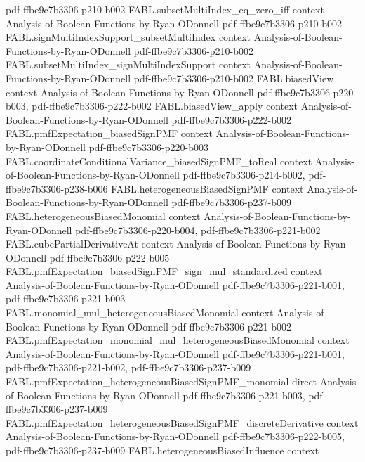 \begin{theorem}
  {pdf-ffbe9c7b3306-p210-b002}
\proofstep
  {FABL.subsetMultiIndex_eq_zero_iff}
  {context}
  {Analysis-of-Boolean-Functions-by-Ryan-ODonnell}
  {pdf-ffbe9c7b3306-p210-b002}
\proofstep
  {FABL.signMultiIndexSupport_subsetMultiIndex}
  {context}
  {Analysis-of-Boolean-Functions-by-Ryan-ODonnell}
  {pdf-ffbe9c7b3306-p210-b002}
\proofstep
  {FABL.subsetMultiIndex_signMultiIndexSupport}
  {context}
  {Analysis-of-Boolean-Functions-by-Ryan-ODonnell}
  {pdf-ffbe9c7b3306-p210-b002}
\proofstep
  {FABL.biasedView}
  {context}
  {Analysis-of-Boolean-Functions-by-Ryan-ODonnell}
  {pdf-ffbe9c7b3306-p220-b003,
    pdf-ffbe9c7b3306-p222-b002}
\proofstep
  {FABL.biasedView_apply}
  {context}
  {Analysis-of-Boolean-Functions-by-Ryan-ODonnell}
  {pdf-ffbe9c7b3306-p222-b002}
\proofstep
  {FABL.pmfExpectation_biasedSignPMF}
  {context}
  {Analysis-of-Boolean-Functions-by-Ryan-ODonnell}
  {pdf-ffbe9c7b3306-p220-b003}
\proofstep
  {FABL.coordinateConditionalVariance_biasedSignPMF_toReal}
  {context}
  {Analysis-of-Boolean-Functions-by-Ryan-ODonnell}
  {pdf-ffbe9c7b3306-p214-b002,
    pdf-ffbe9c7b3306-p238-b006}
\proofstep
  {FABL.heterogeneousBiasedSignPMF}
  {context}
  {Analysis-of-Boolean-Functions-by-Ryan-ODonnell}
  {pdf-ffbe9c7b3306-p237-b009}
\proofstep
  {FABL.heterogeneousBiasedMonomial}
  {context}
  {Analysis-of-Boolean-Functions-by-Ryan-ODonnell}
  {pdf-ffbe9c7b3306-p220-b004,
    pdf-ffbe9c7b3306-p221-b002}
\proofstep
  {FABL.cubePartialDerivativeAt}
  {context}
  {Analysis-of-Boolean-Functions-by-Ryan-ODonnell}
  {pdf-ffbe9c7b3306-p222-b005}
\proofstep
  {FABL.pmfExpectation_biasedSignPMF_sign_mul_standardized}
  {context}
  {Analysis-of-Boolean-Functions-by-Ryan-ODonnell}
  {pdf-ffbe9c7b3306-p221-b001,
    pdf-ffbe9c7b3306-p221-b003}
\proofstep
  {FABL.monomial_mul_heterogeneousBiasedMonomial}
  {context}
  {Analysis-of-Boolean-Functions-by-Ryan-ODonnell}
  {pdf-ffbe9c7b3306-p221-b002}
\proofstep
  {FABL.pmfExpectation_monomial_mul_heterogeneousBiasedMonomial}
  {context}
  {Analysis-of-Boolean-Functions-by-Ryan-ODonnell}
  {pdf-ffbe9c7b3306-p221-b001,
    pdf-ffbe9c7b3306-p221-b002,
    pdf-ffbe9c7b3306-p237-b009}
\proofstep
  {FABL.pmfExpectation_heterogeneousBiasedSignPMF_monomial}
  {direct}
  {Analysis-of-Boolean-Functions-by-Ryan-ODonnell}
  {pdf-ffbe9c7b3306-p221-b003,
    pdf-ffbe9c7b3306-p237-b009}
\proofstep
  {FABL.pmfExpectation_heterogeneousBiasedSignPMF_discreteDerivative}
  {context}
  {Analysis-of-Boolean-Functions-by-Ryan-ODonnell}
  {pdf-ffbe9c7b3306-p222-b005,
    pdf-ffbe9c7b3306-p237-b009}
\proofstep
  {FABL.heterogeneousBiasedInfluence}
  {context}

\end{theorem}
